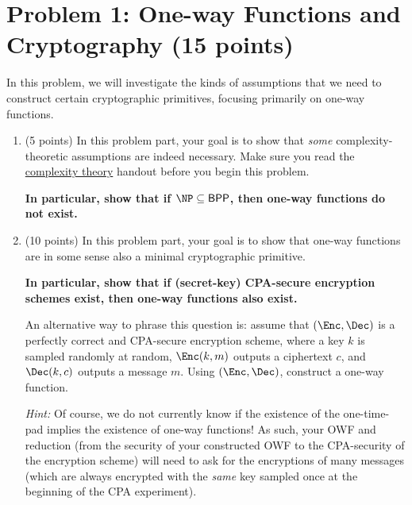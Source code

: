 \documentclass{article}
\newcommand{\BPP}{\mathsf{BPP}}
\begin{document}
\section*{Problem 1: One-way Functions and Cryptography (15 points)}
In this problem, we will investigate the kinds of assumptions that we need to construct certain cryptographic primitives, focusing primarily on one-way functions.
\begin{enumerate}
    \item (5 points) In this problem part, your goal is to show that {\em some} complexity-theoretic assumptions are indeed necessary. Make sure you read the \href{https://mit6875.github.io/FA23HANDOUTS/complexity-updated.pdf}{complexity theory} handout before you begin this problem. 

    \textbf{In particular, show that if $\NP \subseteq \BPP$, then one-way functions do not exist.} 
    \item (10 points) In this problem part, your goal is to show that one-way functions are in some sense also a minimal cryptographic primitive.
    
    \textbf{In particular, show that if (secret-key) CPA-secure encryption schemes exist, then one-way functions also exist.}
    
    An alternative way to phrase this question is: assume that $(\Enc, \Dec)$ is a perfectly correct and CPA-secure encryption scheme, where a key $k$ is sampled randomly at random, $\Enc(k, m)$ outputs a ciphertext $c$, and $\Dec(k, c)$ outputs a message $m$. Using $(\Enc, \Dec)$, construct a one-way function.

    \emph{Hint:} Of course, we do not currently know if the existence of the one-time-pad implies the existence of one-way functions! As such, your OWF and reduction (from the security of your constructed OWF to the CPA-security of the encryption scheme) will need to ask for the encryptions of many messages (which are always encrypted with the \emph{same} key sampled once at the beginning of the CPA experiment).
\end{enumerate}
\end{document}
